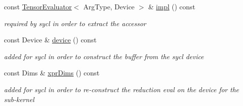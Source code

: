 \begin{DoxyCompactItemize}
const \hyperlink{struct_eigen_1_1_tensor_evaluator}{Tensor\+Evaluator}$<$ Arg\+Type, Device $>$ \& \hyperlink{struct_eigen_1_1_tensor_evaluator_3_01const_01_tensor_reduction_op_3_01_op_00_01_dims_00_01_arg_4fdf2ec1445de4704eb590bc98040dc6_a022a83b1c7a0ae214bb767317a5f11f3}{impl} () const
\begin{DoxyCompactList}\small\item\em required by sycl in order to extract the accessor \end{DoxyCompactList}\item 
\mbox{\label{struct_eigen_1_1_tensor_evaluator_3_01const_01_tensor_reduction_op_3_01_op_00_01_dims_00_01_arg_4fdf2ec1445de4704eb590bc98040dc6_a2bada0128bde434694b50ebdce17366c}} 
const Device \& \hyperlink{struct_eigen_1_1_tensor_evaluator_3_01const_01_tensor_reduction_op_3_01_op_00_01_dims_00_01_arg_4fdf2ec1445de4704eb590bc98040dc6_a2bada0128bde434694b50ebdce17366c}{device} () const
\begin{DoxyCompactList}\small\item\em added for sycl in order to construct the buffer from the sycl device \end{DoxyCompactList}\item 
\mbox{\label{struct_eigen_1_1_tensor_evaluator_3_01const_01_tensor_reduction_op_3_01_op_00_01_dims_00_01_arg_4fdf2ec1445de4704eb590bc98040dc6_af792d6b76a129fcd1b070d1d893299d3}} 
const Dims \& \hyperlink{struct_eigen_1_1_tensor_evaluator_3_01const_01_tensor_reduction_op_3_01_op_00_01_dims_00_01_arg_4fdf2ec1445de4704eb590bc98040dc6_af792d6b76a129fcd1b070d1d893299d3}{xpr\+Dims} () const
\begin{DoxyCompactList}\small\item\em added for sycl in order to re-\/construct the reduction eval on the device for the sub-\/kernel \end{DoxyCompactList}\end{DoxyCompactItemize}

